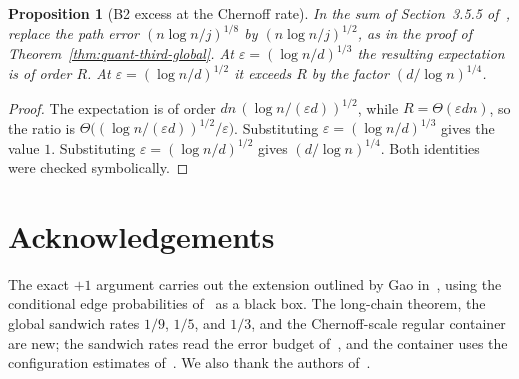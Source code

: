 \documentclass[11pt]{article}
\newtheorem{proposition}[theorem]{Proposition}
\begin{document}
\begin{proposition}[B2 excess at the Chernoff rate]
\label{prop:b2-excess}
In the sum of Section~3.5.5 of~\cite{BIM25}, replace the path error
\((n\log n/j)^{1/8}\) by \((n\log n/j)^{1/2}\), as in the proof of
Theorem~\ref{thm:quant-third-global}.
At \(\varepsilon=(\log n/d)^{1/3}\) the resulting expectation is of order \(R\).
At \(\varepsilon=(\log n/d)^{1/2}\) it exceeds \(R\) by the factor \((d/\log n)^{1/4}\).
\end{proposition}

\begin{proof}
The expectation is of order \(dn\,(\log n/(\varepsilon d))^{1/2}\), while
\(R=\Theta(\varepsilon dn)\), so the ratio is \(\Theta\bigl((\log n/(\varepsilon d))^{1/2}/\varepsilon\bigr)\).
Substituting \(\varepsilon=(\log n/d)^{1/3}\) gives the value \(1\).
Substituting \(\varepsilon=(\log n/d)^{1/2}\) gives \((d/\log n)^{1/4}\).
Both identities were checked symbolically.
\end{proof}

\section*{Acknowledgements}
The exact \(+1\) argument carries out the extension outlined by Gao in~\cite{Gao21},
using the conditional edge probabilities of~\cite{Gao20} as a black box.
The long-chain theorem, the global sandwich rates \(1/9\), \(1/5\), and \(1/3\),
and the Chernoff-scale regular container are new; the sandwich rates read the error
budget of~\cite{BIM25}, and the container uses the configuration estimates of~\cite{CFG25,McK85}.
We also thank the authors of~\cite{HLMPW25}.
\end{document}
